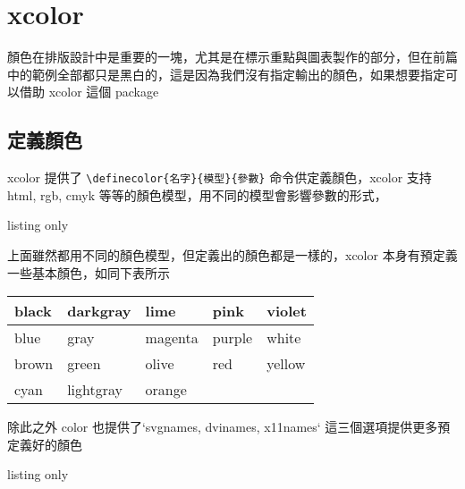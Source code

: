 \chapter{xcolor}

顏色在排版設計中是重要的一塊，尤其是在標示重點與圖表製作的部分，但在前篇中的範例全部都只是黑白的，這是因為我們沒有指定輸出的顏色，如果想要指定可以借助 xcolor 這個 package

\section{定義顏色}

xcolor 提供了 \verb|\definecolor{名字}{模型}{參數}| 命令供定義顏色，xcolor 支持 html, rgb, cmyk 等等的顏色模型，用不同的模型會影響參數的形式，

\begin{tcblisting}{listing only}
\end{tcblisting}

上面雖然都用不同的顏色模型，但定義出的顏色都是一樣的，xcolor 本身有預定義一些基本顏色，如同下表所示

\begin{table}[htp]
\newcommand{\showcolor}[1]{\colorbox{#1}{\hspace{12pt}}#1 \hskip3pt}
\centering
\begin{tabular}{lllll}
\hline
\showcolor{black} & \showcolor{darkgray} & \showcolor{lime} & \showcolor{pink} & \showcolor{violet} \\\hline
\showcolor{blue} & \showcolor{gray} & \showcolor{magenta} & \showcolor{purple} & \showcolor{white} \\\hline
\showcolor{brown} & \showcolor{green} & \showcolor{olive} & \showcolor{red} & \showcolor{yellow} \\\hline
\showcolor{cyan} & \showcolor{lightgray} & \showcolor{orange} &  &  \\\hline
\end{tabular}
\end{table}


除此之外 color 也提供了`svgnames, dvinames, x11names` 這三個選項提供更多預定義好的顏色

\begin{tcblisting}{listing only}
\usepackage[svgnames]{xcolor}
\usepackage[dvinames]{xcolor}
\usepackage[x11names]{xcolor}
\end{tcblisting}

